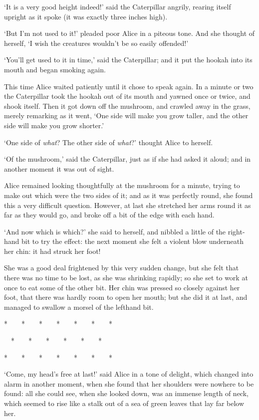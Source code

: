 \documentclass[12pt,openany]{memoir}
\newcommand{\sectionbreak}{
\vspace{0.1cm}
\begin{center}
*~~~~*~~~~*~~~~*~~~~*~~~~*~~~~*

~~*~~~~*~~~~*~~~~*~~~~*~~~~*~~~

*~~~~*~~~~*~~~~*~~~~*~~~~*~~~~*
\end{center}
\vspace{-0.2cm}
}
\begin{document}
`It is a very good height indeed!' said the Caterpillar angrily, rearing itself upright as it spoke (it was exactly three inches high).

`But I'm not used to it!' pleaded poor Alice in a piteous tone. And she thought of herself, `I wish the creatures wouldn't be so easily offended!'

`You'll get used to it in time,' said the Caterpillar; and it put the hookah into its mouth and began smoking again.

This time Alice waited patiently until it chose to speak again. In a minute or two the Caterpillar took the hookah out of its mouth and yawned once or twice, and shook itself. Then it got down off the mushroom, and crawled away in the grass, merely remarking as it went, `One side will make you grow taller, and the other side will make you grow shorter.'

`One side of \textit{what}? The other side of \textit{what}?' thought Alice to herself.

`Of the mushroom,' said the Caterpillar, just as if she had asked it aloud; and in another moment it was out of sight.

Alice remained looking thoughtfully at the mushroom for a minute, trying to make out which were the two sides of it; and as it was perfectly round, she found this a very difficult question. However, at last she stretched her arms round it as far as they would go, and broke off a bit of the edge with each hand.

`And now which is which?' she said to herself, and nibbled a little of the right-hand bit to try the effect: the next moment she felt a violent blow underneath her chin: it had struck her foot!

She was a good deal frightened by this very sudden change, but she felt that there was no time to be lost, as she was shrinking rapidly; so she set to work at once to eat some of the other bit. Her chin was pressed so closely against her foot, that there was hardly room to open her mouth; but she did it at last, and managed to swallow a morsel of the lefthand bit.

\sectionbreak

`Come, my head's free at last!' said Alice in a tone of delight, which changed into alarm in another moment, when she found that her shoulders were nowhere to be found: all she could see, when she looked down, was an immense length of neck, which seemed to rise like a stalk out of a sea of green leaves that lay far below her.
\end{document}
